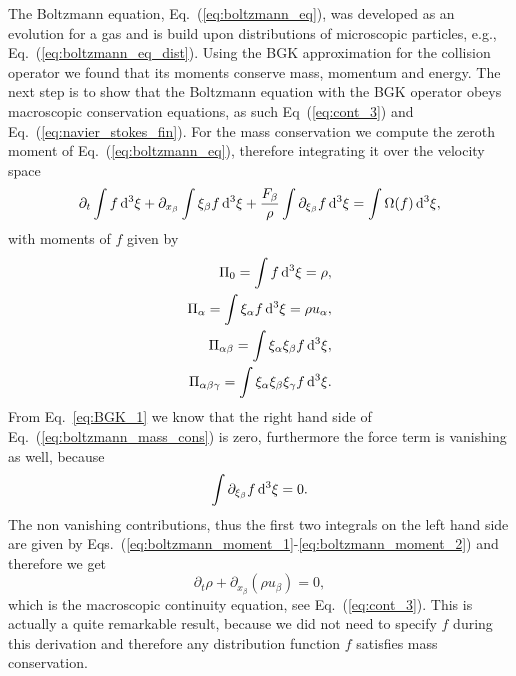 The Boltzmann equation, Eq.~(\ref{eq:boltzmann_eq}), was developed as an evolution for a gas and is build upon distributions of microscopic particles, e.g., Eq.~(\ref{eq:boltzmann_eq_dist}).
Using the BGK approximation for the collision operator we found that its moments conserve mass, momentum and energy.
The next step is to show that the Boltzmann equation with the BGK operator obeys macroscopic conservation equations, as such Eq~(\ref{eq:cont_3}) and Eq.~(\ref{eq:navier_stokes_fin}).
For the mass conservation we compute the zeroth moment of Eq.~(\ref{eq:boltzmann_eq}), therefore integrating it over the velocity space
\begin{equation}\label{eq:boltzmann_mass_cons}
    \partial_t\int f\mathop{}\!\mathrm{d}^3\xi + \partial_{x_{\beta}}\int\xi_{\beta} f\mathop{}\!\mathrm{d}^3\xi + \frac{F_{\beta}}{\rho}\int\partial_{\xi_{\beta}}f\mathop{}\!\mathrm{d}^3\xi = \int\Omega(f)\mathop{}\!\mathrm{d}^3\xi,
\end{equation}
with moments of $f$ given by
\begin{align}
    \Pi_0 = \int f\mathop{}\!\mathrm{d}^3\xi = \rho, \label{eq:boltzmann_moment_1}\\
    \Pi_{\alpha} = \int\xi_{\alpha} f\mathop{}\!\mathrm{d}^3\xi = \rho u_{\alpha}, \label{eq:boltzmann_moment_2}\\
    \Pi_{\alpha\beta} = \int\xi_{\alpha}\xi_{\beta} f\mathop{}\!\mathrm{d}^3\xi, \label{eq:boltzmann_moment_3}\\
    \Pi_{\alpha\beta\gamma} = \int\xi_{\alpha}\xi_{\beta}\xi_{\gamma} f\mathop{}\!\mathrm{d}^3\xi. \label{eq:boltzmann_moment_4}
\end{align}
From Eq.~\ref{eq:BGK_1} we know that the right hand side of Eq.~(\ref{eq:boltzmann_mass_cons}) is zero, furthermore the force term is vanishing as well, because~\cite{krugerLatticeBoltzmannMethod2017} 
\begin{equation}
    \int\partial_{\xi_{\beta}}f\mathop{}\!\mathrm{d}^3\xi = 0.
\end{equation}
The non vanishing contributions, thus the first two integrals on the left hand side are given by Eqs.~(\ref{eq:boltzmann_moment_1}-\ref{eq:boltzmann_moment_2}) and therefore we get
\begin{equation}\label{eq:mass_boltzmann}
    \partial_t \rho + \partial_{x_{\beta}}(\rho u_{\beta}) = 0, 
\end{equation}
which is the macroscopic continuity equation, see Eq.~(\ref{eq:cont_3}).
This is actually a quite remarkable result, because we did not need to specify $f$ during this derivation and therefore any distribution function $f$ satisfies mass conservation.

